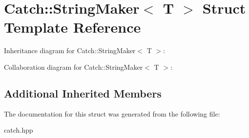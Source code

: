 \hypertarget{structCatch_1_1StringMaker}{}\section{Catch\+:\+:String\+Maker$<$ T $>$ Struct Template Reference}
\label{structCatch_1_1StringMaker}


Inheritance diagram for Catch\+:\+:String\+Maker$<$ T $>$\+:


Collaboration diagram for Catch\+:\+:String\+Maker$<$ T $>$\+:
\subsection*{Additional Inherited Members}


The documentation for this struct was generated from the following file\+:\begin{DoxyCompactItemize}
\item 
catch.\+hpp\end{DoxyCompactItemize}
